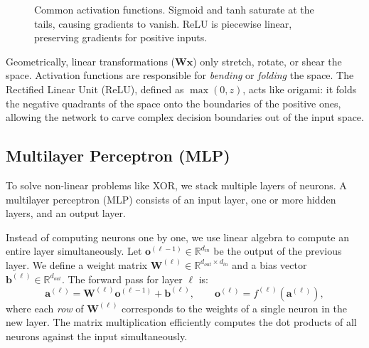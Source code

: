 \documentclass{tufte-handout}
\begin{document}
\begin{figure}[h]
\centering
{}
\caption{Common activation functions. Sigmoid and tanh saturate at the tails, causing gradients to vanish. ReLU is piecewise linear, preserving gradients for positive inputs.}
\label{fig:activations}
\end{figure}

Geometrically, linear transformations ($\mathbf{W}\mathbf{x}$) only stretch, rotate, or shear the space. Activation functions are responsible for \textit{bending} or \textit{folding} the space. The Rectified Linear Unit (ReLU), defined as $\max(0, z)$, acts like origami: it folds the negative quadrants of the space onto the boundaries of the positive ones, allowing the network to carve complex decision boundaries out of the input space.

\subsection{Multilayer Perceptron (MLP)}

To solve non-linear problems like XOR, we stack multiple layers of neurons. A multilayer perceptron (MLP) consists of an input layer, one or more hidden layers, and an output layer. 

Instead of computing neurons one by one, we use linear algebra to compute an entire layer simultaneously. Let $\mathbf{o}^{(\ell-1)} \in \mathbb{R}^{d_{in}}$ be the output of the previous layer. We define a weight matrix $\mathbf{W}^{(\ell)} \in \mathbb{R}^{d_{out} \times d_{in}}$ and a bias vector $\mathbf{b}^{(\ell)} \in \mathbb{R}^{d_{out}}$. The forward pass for layer $\ell$ is:
\[
\mathbf{a}^{(\ell)} = \mathbf{W}^{(\ell)}\mathbf{o}^{(\ell-1)} + \mathbf{b}^{(\ell)},\qquad 
\mathbf{o}^{(\ell)} = f^{(\ell)}(\mathbf{a}^{(\ell)}),
\]
where each \textit{row} of $\mathbf{W}^{(\ell)}$ corresponds to the weights of a single neuron in the new layer. The matrix multiplication efficiently computes the dot products of all neurons against the input simultaneously.
\end{document}
